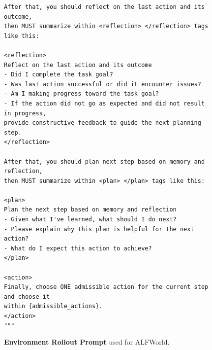 \begin{figure}[htbp]
\begin{tcolorbox}
\begin{verbatim}
After that, you should reflect on the last action and its outcome, 
then MUST summarize within <reflection> </reflection> tags like this:

<reflection>
Reflect on the last action and its outcome
- Did I complete the task goal?
- Was last action successful or did it encounter issues?
- Am I making progress toward the task goal?
- If the action did not go as expected and did not result in progress,
provide constructive feedback to guide the next planning step.
</reflection>

After that, you should plan next step based on memory and reflection, 
then MUST summarize within <plan> </plan> tags like this:

<plan>
Plan the next step based on memory and reflection
- Given what I've learned, what should I do next?
- Please explain why this plan is helpful for the next action?
- What do I expect this action to achieve?
</plan>

<action>
Finally, choose ONE admissible action for the current step and choose it 
within {admissible_actions}.
</action>
"""
\end{verbatim}
\end{tcolorbox}
\vspace{-1em}
\caption{\textbf{Environment Rollout Prompt} used for ALFWorld.}
\label{fig:taskscore_prompt}
\end{figure}




